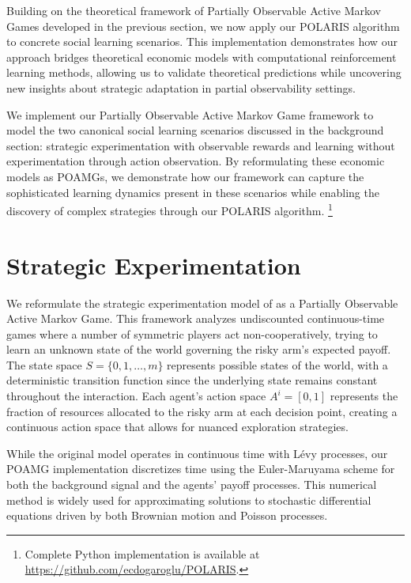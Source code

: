 Building on the theoretical framework of Partially Observable Active Markov Games developed in the previous section, we now apply our POLARIS algorithm to concrete social learning scenarios. This implementation demonstrates how our approach bridges theoretical economic models with computational reinforcement learning methods, allowing us to validate theoretical predictions while uncovering new insights about strategic adaptation in partial observability settings.

We implement our Partially Observable Active Markov Game framework to model the two canonical social learning scenarios discussed in the background section: strategic experimentation with observable rewards and learning without experimentation through action observation. By reformulating these economic models as POAMGs, we demonstrate how our framework can capture the sophisticated learning dynamics present in these scenarios while enabling the discovery of complex strategies through our POLARIS algorithm. \footnote{Complete Python implementation is available at \url{https://github.com/ecdogaroglu/POLARIS}.}

\section{Strategic Experimentation}

We reformulate the strategic experimentation model of \citet{keller2020undiscounted} as a Partially Observable Active Markov Game. This framework analyzes undiscounted continuous-time games where a number of symmetric players act non-cooperatively, trying to learn an unknown state of the world governing the risky arm's expected payoff. The state space $S = \{0,1,\ldots,m\}$ represents possible states of the world, with a deterministic transition function since the underlying state remains constant throughout the interaction. Each agent's action space $A^i = [0,1]$ represents the fraction of resources allocated to the risky arm at each decision point, creating a continuous action space that allows for nuanced exploration strategies.

While the original model operates in continuous time with Lévy processes, our POAMG implementation discretizes time using the Euler-Maruyama scheme \citep{kloeden1992numerical, platen1999introduction} for both the background signal and the agents' payoff processes. This numerical method is widely used for approximating solutions to stochastic differential equations driven by both Brownian motion and Poisson processes.

